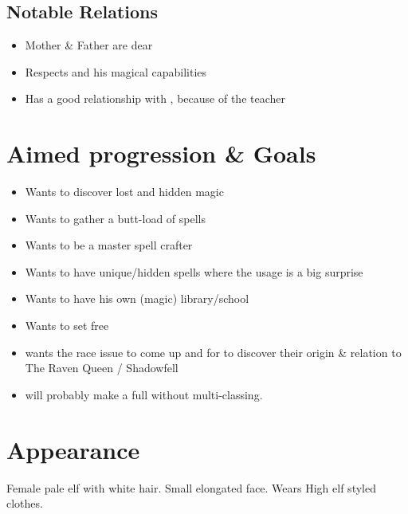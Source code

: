     \subsection{Notable Relations}
    \begin{itemize}
        \item Mother \& Father are dear
        \item Respects \Master{} and his magical capabilities
        \item Has a good relationship with \CloisterIntro{}, because of the teacher
    \end{itemize}

    \section{Aimed progression \& Goals}
    \begin{itemize}
        \item Wants to discover lost and hidden magic
        \item Wants to gather a butt-load of spells
        \item Wants to be a master spell crafter
        \item Wants to have unique/hidden spells where the usage is a big surprise
        \item Wants to have his own (magic) library/school
        \item Wants to set \Master{} free
        \item \bookauthor{} wants the race issue to come up and for \Name{} to discover their origin \& relation to The Raven Queen / Shadowfell
        \item \bookauthor{} will probably make \Name{} a full \Class{} without multi-classing.
    \end{itemize}

    \section{Appearance}

    Female pale elf with white hair. Small elongated face. Wears High elf styled clothes.

\fi